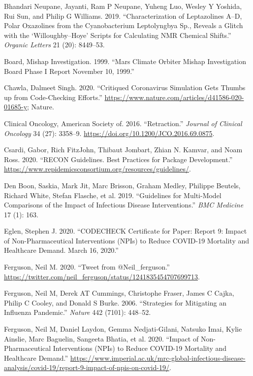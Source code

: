 \documentclass[]{elsarticle} %
\begin{document}
\leavevmode\hypertarget{ref-bhandari2019characterization}{}%
Bhandari Neupane, Jayanti, Ram P Neupane, Yuheng Luo, Wesley Y Yoshida, Rui Sun, and Philip G Williams. 2019. ``Characterization of Leptazolines A--D, Polar Oxazolines from the Cyanobacterium Leptolyngbya Sp., Reveals a Glitch with the `Willoughby--Hoye' Scripts for Calculating NMR Chemical Shifts.'' \emph{Organic Letters} 21 (20): 8449--53.

\leavevmode\hypertarget{ref-board1999mars}{}%
Board, Mishap Investigation. 1999. ``Mars Climate Orbiter Mishap Investigation Board Phase I Report November 10, 1999.''

\leavevmode\hypertarget{ref-ferg_pol}{}%
Chawla, Dalmeet Singh. 2020. ``Critiqued Coronavirus Simulation Gets Thumbs up from Code-Checking Efforts.'' \url{https://www.nature.com/articles/d41586-020-01685-y}; Nature.

\leavevmode\hypertarget{ref-retract}{}%
Clinical Oncology, American Society of. 2016. ``Retraction.'' \emph{Journal of Clinical Oncology} 34 (27): 3358--9. \url{https://doi.org/10.1200/JCO.2016.69.0875}.

\leavevmode\hypertarget{ref-RECON}{}%
Csardi, Gabor, Rich FitzJohn, Thibaut Jombart, Zhian N. Kamvar, and Noam Ross. 2020. ``RECON Guidelines. Best Practices for Package Development.'' \url{https://www.repidemicsconsortium.org/resources/guidelines/}.

\leavevmode\hypertarget{ref-den2019guidelines}{}%
Den Boon, Saskia, Mark Jit, Marc Brisson, Graham Medley, Philippe Beutels, Richard White, Stefan Flasche, et al. 2019. ``Guidelines for Multi-Model Comparisons of the Impact of Infectious Disease Interventions.'' \emph{BMC Medicine} 17 (1): 163.

\leavevmode\hypertarget{ref-ferg_check}{}%
Eglen, Stephen J. 2020. ``CODECHECK Certificate for Paper: Report 9: Impact of Non-Pharmaceutical Interventions (NPIs) to Reduce COVID-19 Mortality and Healthcare Demand. March 16, 2020.''

\leavevmode\hypertarget{ref-ferg_tweet}{}%
Ferguson, Neil M. 2020. ``Tweet from @Neil\_ferguson.'' \url{https://twitter.com/neil_ferguson/status/1241835454707699713}.

\leavevmode\hypertarget{ref-ferguson2006strategies}{}%
Ferguson, Neil M, Derek AT Cummings, Christophe Fraser, James C Cajka, Philip C Cooley, and Donald S Burke. 2006. ``Strategies for Mitigating an Influenza Pandemic.'' \emph{Nature} 442 (7101): 448--52.

\leavevmode\hypertarget{ref-imperial}{}%
Ferguson, Neil M, Daniel Laydon, Gemma Nedjati-Gilani, Natsuko Imai, Kylie Ainslie, Marc Baguelin, Sangeeta Bhatia, et al. 2020. ``Impact of Non-Pharmaceutical Interventions (NPIs) to Reduce COVID-19 Mortality and Healthcare Demand.'' \url{https://www.imperial.ac.uk/mrc-global-infectious-disease-analysis/covid-19/report-9-impact-of-npis-on-covid-19/}.
\end{document}
